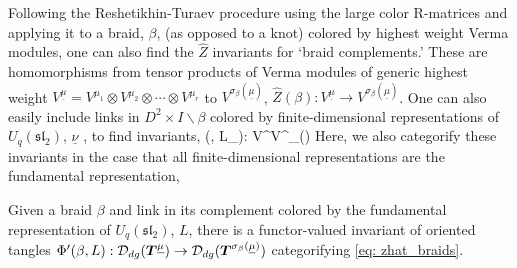 \documentclass{article}
\begin{document}
Following the Reshetikhin-Turaev procedure using the large color R-matrices and applying it to a braid, $\beta$, (as opposed to a knot) colored by highest weight Verma modules, one can also find the $\hat{Z}$ invariants for `braid complements.' These are homomorphisms from tensor products of Verma modules of generic highest weight $V^{\underline{\mu}} = V^{\mu_1}\otimes V^{\mu_2}\otimes \cdots \otimes V^{\mu_r}$ to $V^{\sigma_\beta (\underline{\mu})}$, 
$\hat{Z}(\beta): V^{\underline{\mu}}\rightarrow V^{\sigma_\beta (\underline{\mu})}$. One can also easily include links in $D^2\times I \backslash\beta$ colored by finite-dimensional representations of $U_q(\mathfrak{sl}_2)$, $\underline{\nu}$ , to find invariants, 
\be {}(\beta, L_{\underline{\nu}}): V^{\underline{\mu}}\rightarrow V^{\sigma_\beta (\underline{\mu})} \label{eq: zhat_braids}\ee
Here, we also categorify these invariants in the case that all finite-dimensional representations are the fundamental representation, 

\begin{thm}
Given a braid $\beta$ and link in its complement colored by the fundamental representation of $U_q(\mathfrak{sl}_2)$, $L$, there is a functor-valued invariant of oriented tangles $\Phi'(\beta,L): \mathcal{D}_{dg}({\boldsymbol{T}}^{\underline{\mu}}) \rightarrow \mathcal{D}_{dg}({\boldsymbol{T}}^{\sigma_\beta(\underline{\mu})})$ categorifying \eqref{eq: zhat_braids}. 
\end{thm}
\end{document}
